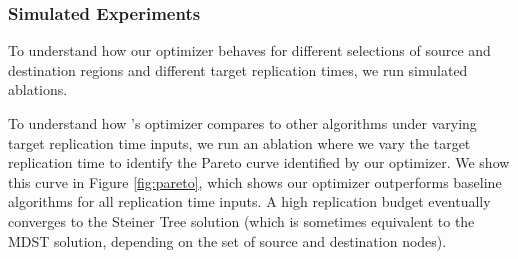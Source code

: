 





\subsubsection{Simulated Experiments}
To understand how our optimizer behaves for different selections of source and destination regions and different target replication times, we run simulated ablations. \label{sec:simulated_section}

To understand how \sys{}'s optimizer compares to other algorithms under varying target replication time inputs, we run an ablation where we vary the target replication time to identify the Pareto curve identified by our optimizer. We show this curve in Figure \ref{fig:pareto}, which shows our optimizer outperforms baseline algorithms for all replication time inputs. A high replication budget eventually converges to the Steiner Tree solution (which is sometimes equivalent to the MDST solution, depending on the set of source and destination nodes).  


